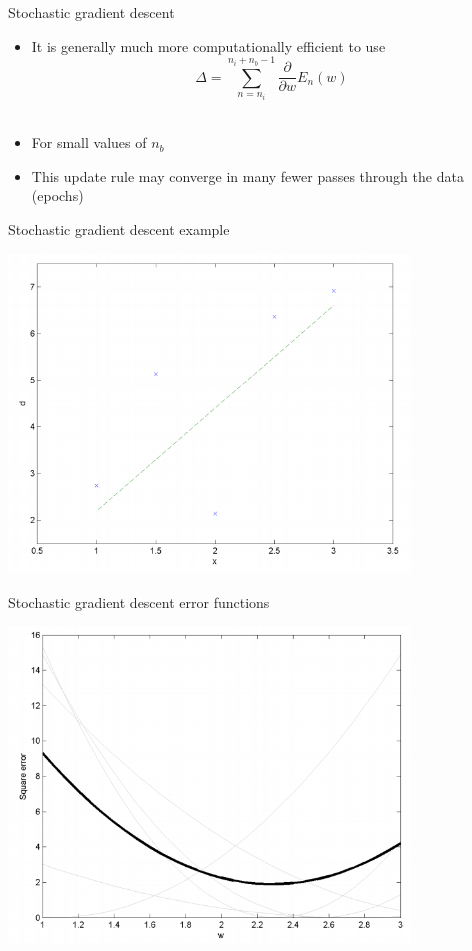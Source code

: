 \documentclass[notes]{beamer}
\providecommand{\tightlist}{%
  \setlength{\itemsep}{0pt}\setlength{\parskip}{0pt}}
\begin{document}
\begin{frame}{Stochastic gradient descent}

\begin{itemize}
\tightlist
\item
  It is generally much more computationally efficient to use
  \[\Delta =  \sum_{n=n_i}^{n_i+n_b-1} \frac{\partial}{\partial w}E_n(w) \]\\
\item
  For small values of \(n_b\)
\item
  This update rule may converge in many fewer passes through the data
  (epochs)
\end{itemize}

\end{frame}

\begin{frame}{Stochastic gradient descent example}

\centering 

\includegraphics[width=0.80000\textwidth]{2018-03-10-10-00-53.png}\\

\end{frame}

\begin{frame}{Stochastic gradient descent error functions}

\centering 

\includegraphics[width=0.80000\textwidth]{2018-03-10-10-01-05.png}\\

\end{frame}
\end{document}
